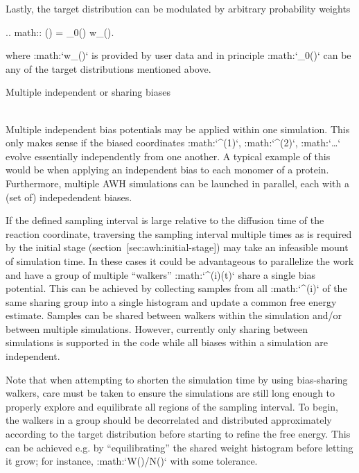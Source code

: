 Lastly, the target distribution can be modulated by arbitrary
probability weights

.. math:: \rho(\lambda) = \rho_0(\lambda) w_{}(\lambda).

where :math:`w_{}(\lambda)` is provided by user data and
in principle :math:`\rho_0(\lambda)` can be any of the target
distributions mentioned above.

Multiple independent or sharing biases
~~~~~~~~~~~~~~~~~~~~~~~~~~~~~~~~~~~~~~

Multiple independent bias potentials may be applied within one
simulation. This only makes sense if the biased coordinates
:math:`\xi^{(1)}`, :math:`\xi^{(2)}`, :math:`\ldots` evolve essentially
independently from one another. A typical example of this would be when
applying an independent bias to each monomer of a protein. Furthermore,
multiple AWH simulations can be launched in parallel, each with a (set
of) indepedendent biases.

If the defined sampling interval is large relative to the diffusion time
of the reaction coordinate, traversing the sampling interval multiple
times as is required by the initial stage
(section [sec:awh:initial-stage]) may take an infeasible mount of
simulation time. In these cases it could be advantageous to parallelize
the work and have a group of multiple “walkers” :math:`\xi^{(i)}(t)`
share a single bias potential. This can be achieved by collecting
samples from all :math:`\xi^{(i)}` of the same sharing group into a
single histogram and update a common free energy estimate. Samples can
be shared between walkers within the simulation and/or between multiple
simulations. However, currently only sharing between simulations is
supported in the code while all biases within a simulation are
independent.

Note that when attempting to shorten the simulation time by using
bias-sharing walkers, care must be taken to ensure the simulations are
still long enough to properly explore and equilibrate all regions of the
sampling interval. To begin, the walkers in a group should be
decorrelated and distributed approximately according to the target
distribution before starting to refine the free energy. This can be
achieved e.g. by “equilibrating” the shared weight histogram before
letting it grow; for instance, :math:`W(\lambda)/N\approx \rho(\lambda)`
with some tolerance.

